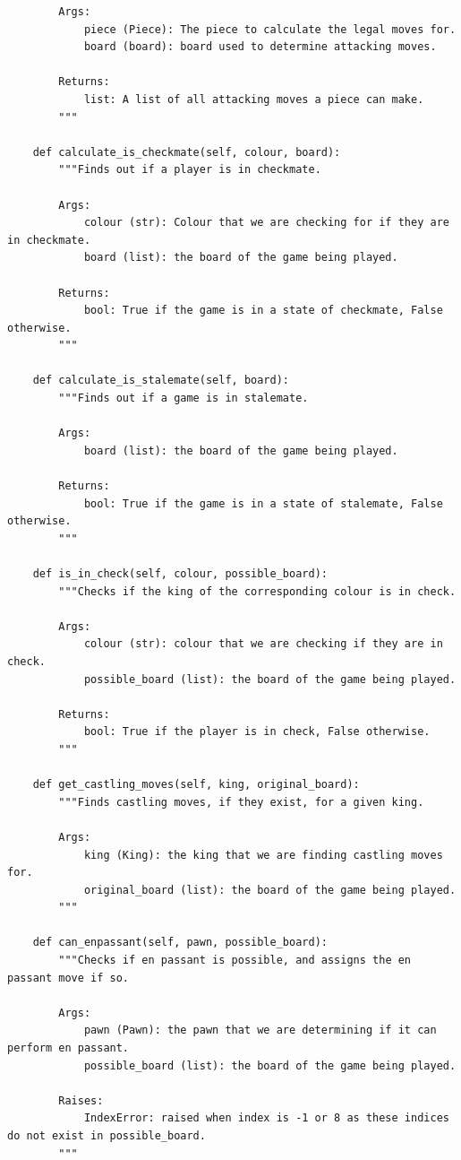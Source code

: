 \begin{verbatim}
		Args:
			piece (Piece): The piece to calculate the legal moves for.
			board (board): board used to determine attacking moves.
		
		Returns:
			list: A list of all attacking moves a piece can make.
		"""
	
 	def calculate_is_checkmate(self, colour, board):
		"""Finds out if a player is in checkmate.
	
		Args:
			colour (str): Colour that we are checking for if they are in checkmate.
			board (list): the board of the game being played.
		
		Returns:
			bool: True if the game is in a state of checkmate, False otherwise.
		"""
	
 	def calculate_is_stalemate(self, board):
		"""Finds out if a game is in stalemate.
	
		Args:
			board (list): the board of the game being played.
	
		Returns:
			bool: True if the game is in a state of stalemate, False otherwise.
		"""
	
 	def is_in_check(self, colour, possible_board):
		"""Checks if the king of the corresponding colour is in check.
	
		Args:
			colour (str): colour that we are checking if they are in check.
			possible_board (list): the board of the game being played.
	
		Returns:
			bool: True if the player is in check, False otherwise.
		"""
	
 	def get_castling_moves(self, king, original_board):
		"""Finds castling moves, if they exist, for a given king.
	
		Args:
			king (King): the king that we are finding castling moves for.
			original_board (list): the board of the game being played.
		"""
	
 	def can_enpassant(self, pawn, possible_board):
		"""Checks if en passant is possible, and assigns the en passant move if so.
	
		Args:
			pawn (Pawn): the pawn that we are determining if it can perform en passant.
			possible_board (list): the board of the game being played.
	
		Raises:
			IndexError: raised when index is -1 or 8 as these indices do not exist in possible_board.
		"""
\end{verbatim}
